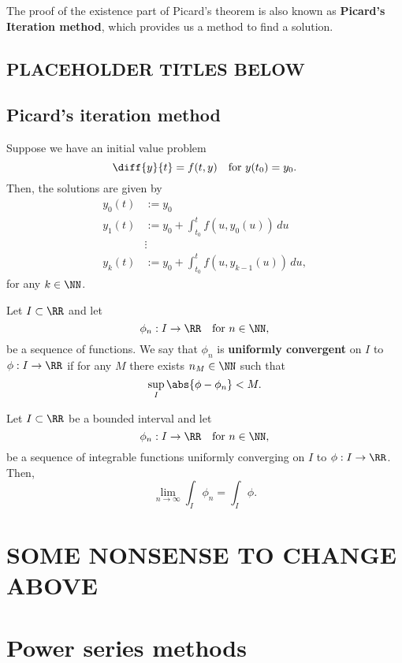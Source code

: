 \documentclass[12pt, a4paper]{article}
\begin{document}
The proof of the existence part of Picard's theorem is also known as \textbf{Picard's Iteration method}, which provides us a method to find a solution.

\subsection{PLACEHOLDER TITLES BELOW}

\subsection{Picard's iteration method}

\begin{mdthm}
    Suppose we have an initial value problem 
    \[\diff{y}{t} = f(t,y) \quad \text{for } y(t_0)=y_0.\]
    Then, the solutions are given by 
    \[\begin{aligned}
        y_0(t) &:= y_0 \\
        y_1(t) &:= y_0 +\int_{t_0}^{t} f(u,y_0(u)) \, du \\
        &\vdots  \\
        y_k(t) &:= y_0 + \int_{t_0}^{t} f(u,y_{k-1}(u)) \, du,
    \end{aligned}\]
    for any \(k \in \NN\).
\end{mdthm}

\begin{definition}
    Let \(I \subset \RR\) and let 
    \[\phi_n: I \to \RR \quad \text{for } n \in \NN,\]
    be a sequence of functions. We say that \(\phi_n\) is \textbf{uniformly convergent} on \(I\) to \(\phi :I \to \RR\) if for any \(M\) there exists \(n_M \in \NN\) such that 
    \[\sup_I \abs{\phi-\phi_n} < M.\]
\end{definition}

\begin{lemma}
    Let \(I \subset \RR\) be a bounded interval and let 
    \[\phi_n: I \to \RR \quad \text{for } n \in \NN,\]
    be a sequence of integrable functions uniformly converging on \(I\) to \(\phi:I \to \RR\). Then,
    \[\lim_{n\to \infty} \int_I \phi_n = \int_I \phi.\]
\end{lemma}

\section{SOME NONSENSE TO CHANGE ABOVE}

\section{Power series methods}
\end{document}
